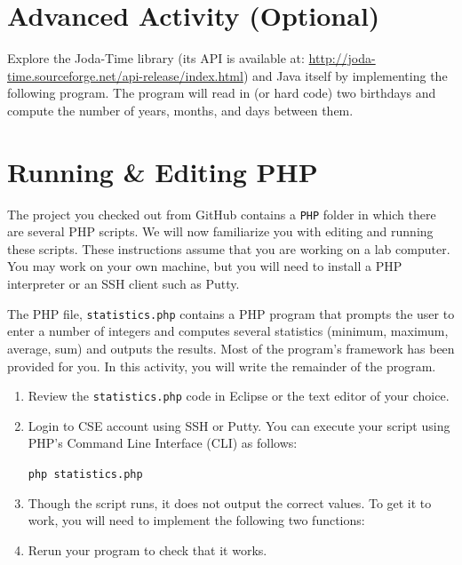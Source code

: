 \documentclass[12pt]{scrartcl}
\begin{document}
\section*{Advanced Activity (Optional)}

Explore the Joda-Time library (its API is available at: \url{http://joda-time.sourceforge.net/api-release/index.html}) and Java itself by implementing the following program.  The program will read in (or hard code) two birthdays and compute the number of years, months, and days between them.  

\section{Running \& Editing PHP}
\label{section:phpPart}

The project you checked out from GitHub contains a \texttt{PHP}
folder in which there are several PHP scripts.  We will now familiarize
you with editing and running these scripts.  These instructions assume
that you are working on a lab computer.  You may work on your own 
machine, but you will need to install a PHP interpreter or an SSH client 
such as Putty.

The PHP file, \texttt{statistics.php} contains a PHP program 
that prompts the user to enter a number of integers and computes several 
statistics (minimum, maximum, average, sum) and outputs the results.  
Most of the program's framework has been provided for you.  In this 
activity, you will write the remainder of the program.

\begin{enumerate}
  \item Review the \texttt{statistics.php} code in Eclipse or
    the text editor of your choice.
  \item Login to CSE account using SSH or Putty.  You can execute your 
  	script using PHP's Command Line Interface (CLI) as follows:
	
    \texttt{php statistics.php}
	
  \item Though the script runs, it does not output the correct values.  
	To get it to work, you will need to implement the following two 
	functions:
  \item Rerun your program to check that it works.
\end{enumerate}
\end{document}
